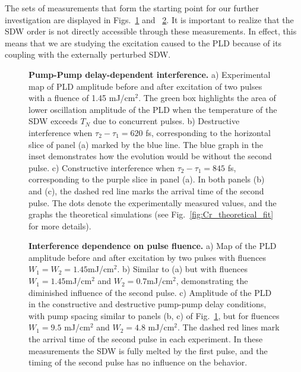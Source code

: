 The sets of measurements that form the starting point for our further investigation are displayed in Figs.~\ref{fig:Cr_experimental1} and ~\ref{fig:Cr_experimental2}.
It is important to realize that the \gls{SDW} order is not directly accessible through these measurements. In effect, this means that we are studying the excitation caused to the \gls{PLD} because of its coupling with the externally perturbed \gls{SDW}.
\begin{figure}
	\centering
{}
\caption{\label{fig:Cr_experimental1}{\bf Pump-Pump delay-dependent interference.} a) Experimental map of \gls{PLD} amplitude before and after excitation of two pulses with a fluence of 1.45 mJ/cm$^2$. The green box highlights the area of lower oscillation amplitude of the \gls{PLD} when the temperature of the \gls{SDW} exceeds $T_N$ due to concurrent pulses. b) Destructive interference when $\tau_2 - \tau_1 = 620$ fs, corresponding to the horizontal slice of panel (a) marked by the blue line. The blue graph in the inset demonstrates how the evolution would be without the second pulse. c) Constructive interference when $\tau_2 - \tau_1 = 845$ fs, corresponding to the purple slice in panel (a). In both panels (b) and (c), the dashed red line marks the arrival time of the second pulse. The dots denote the experimentally measured values, and the graphs the theoretical simulations (see Fig.~\ref{fig:Cr_theoretical_fit} for more details).}
\end{figure}
\begin{figure}
	\centering
{}
\caption{\label{fig:Cr_experimental2}{\bf Interference dependence on pulse fluence.} a) Map of the \gls{PLD} amplitude before and after excitation by two pulses with fluences $W_1=W_2=1.45$mJ/cm$^2$. b) Similar to (a) but with fluences $W_1=1.45$mJ/cm$^2$ and $W_2=0.7$mJ/cm$^2$, demonstrating the diminished influence of the second pulse. c) Amplitude of the \gls{PLD} in the constructive and destructive pump-pump delay conditions, with pump spacing similar to panels (b, c) of Fig.~\ref{fig:Cr_experimental1}, but for fluences $W_1 = 9.5$ mJ/cm$^2$ and $W_2 = 4.8$ mJ/cm$^2$. The dashed red lines mark the arrival time of the second pulse in each experiment. In these measurements the \gls{SDW} is fully melted by the first pulse, and the timing of the second pulse has no influence on the behavior.}
\end{figure}

